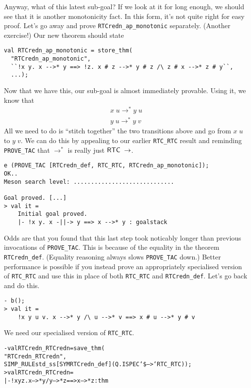     Anyway, what of this latest sub-goal?  If we look at it for long
    enough, we should see that it is another monotonicity fact.  In
    this form, it's not quite right for easy proof.  Let's go away and
    prove \texttt{RTCredn\_ap\_monotonic} separately. (Another
    exercise!)  Our new theorem should state
\begin{session}
\begin{verbatim}
val RTCredn_ap_monotonic = store_thm(
  "RTCredn_ap_monotonic",
  ``!x y. x -->* y ==> !z. x # z -->* y # z /\ z # x -->* z # y``,
  ...);
\end{verbatim}
\end{session}
    Now that we have this, our sub-goal is almost immediately
    provable.  Using it, we know that \[\begin{array}{c}
      x\;u \rightarrow^* y\;u \\
      y\;u \rightarrow^* y\;v
    \end{array}\]
    All we need to do is ``stitch together'' the two transitions above
    and go from $x\;u$ to $y\;v$.  We can do this by appealing to our
    earlier \texttt{RTC\_RTC} result and reminding \texttt{PROVE\_TAC}
    that $\rightarrow^*$ is really just
    ${\sf RTC}\;\rightarrow$.
\begin{session}
\begin{verbatim}
e (PROVE_TAC [RTCredn_def, RTC_RTC, RTCredn_ap_monotonic]);
OK..
Meson search level: .............................

Goal proved. [...]
> val it =
    Initial goal proved.
    |- !x y. x -||-> y ==> x -->* y : goalstack
\end{verbatim}
\end{session}
Odds are that you found that this last step took noticably longer than
previous invocations of \texttt{PROVE\_TAC}.  This is because of the
equality in the theorem \texttt{RTCredn\_def}.  (Equality reasoning
always slows \texttt{PROVE\_TAC} down.) Better performance is possible
if you instead prove an appropriately specialised version of
\texttt{RTC\_RTC} and use this in place of both \texttt{RTC\_RTC} and
\texttt{RTCredn\_def}.  Let's go back and do this.
\begin{session}
\begin{verbatim}
- b();
> val it =
    !x y u v. x -->* y /\ u -->* v ==> x # u -->* y # v
\end{verbatim}
\end{session}
We need our specialised version of \texttt{RTC\_RTC}.
\begin{session}\begin{alltt}
- val RTCredn_RTCredn = save_thm(
    "RTCredn_RTCredn",
    SIMP_RULE std_ss [SYM RTCredn_def] (Q.ISPEC `\$-->` RTC_RTC));
> val RTCredn_RTCredn =
    |- !x y z. x -->* y /\bk{} y -->* z ==> x -->* z : thm
\end{alltt}\end{session}
